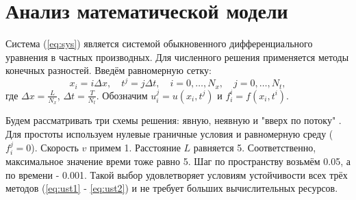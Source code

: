\chapter{Анализ математической модели}
Система (\ref{eq:sys}) является системой обыкновенного дифференциального уравнения в частных производных.
Для численного решения применяется методы конечных разностей\cite{Turchak2003}. Введём равномерную сетку:
\[
x_i = i \Delta x, \quad t^j = j \Delta t, \quad i = 0, \dots, N_x, \quad j = 0, \dots, N_t,
\]
где $\Delta x = \frac{L}{N_x}$, $\Delta t = \frac{T}{N_t}$. Обозначим $u_i^j = u(x_i, t^j)$ и $f_{i}^i = f (x_{i}, t^i)$.

Будем рассматривать три схемы решения: явную\cite{Turchak2003}, неявную\cite{Turchak2003} и "вверх по потоку" \cite{Patankar1984}.
Для простоты используем нулевые граничные условия и равномерную среду ($f_{i}^j = 0$). 
Скорость $v$ примем 1. Расстояние $L$ равняется 5. Соответственно, максимальное значение времи тоже равно 5.
Шаг по пространству возьмём 0.05, а по времени - 0.001. Такой выбор удовлетворяет условиям устойчивости всех трёх методов (\ref{eq:ust1} - \ref{eq:ust2}) и не требует больших вычислительных ресурсов.




